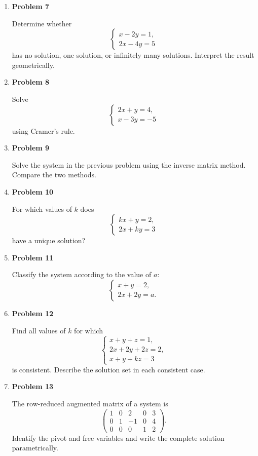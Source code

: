 \begin{enumerate}
\item \textbf{Problem 7}\par
Determine whether
\[
\begin{cases}
x-2y=1,\\
2x-4y=5
\end{cases}
\]
has no solution, one solution, or infinitely many solutions. Interpret the result geometrically.

\item \textbf{Problem 8}\par
Solve
\[
\begin{cases}
2x+y=4,\\
x-3y=-5
\end{cases}
\]
using Cramer's rule.

\item \textbf{Problem 9}\par
Solve the system in the previous problem using the inverse matrix method. Compare the two methods.

\item \textbf{Problem 10}\par
For which values of \(k\) does
\[
\begin{cases}
kx+y=2,\\
2x+ky=3
\end{cases}
\]
have a unique solution?

\item \textbf{Problem 11}\par
Classify the system according to the value of \(a\):
\[
\begin{cases}
x+y=2,\\
2x+2y=a.
\end{cases}
\]

\item \textbf{Problem 12}\par
Find all values of \(k\) for which
\[
\begin{cases}
x+y+z=1,\\
2x+2y+2z=2,\\
x+y+kz=3
\end{cases}
\]
is consistent. Describe the solution set in each consistent case.

\item \textbf{Problem 13}\par
The row-reduced augmented matrix of a system is
\[
\left(
\begin{array}{cccc|c}
1&0&2&0&3\\
0&1&-1&0&4\\
0&0&0&1&2
\end{array}
\right).
\]
Identify the pivot and free variables and write the complete solution parametrically.


\end{enumerate}
